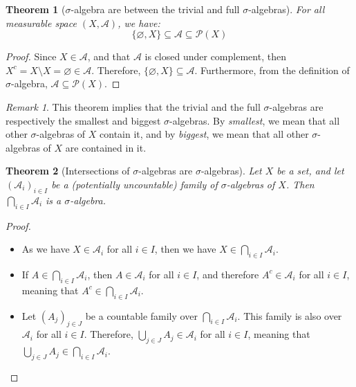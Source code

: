 \documentclass{article}
\newtheorem{theorem}{Theorem}[section]
\theoremstyle{definition}
\theoremstyle{remark}
\newtheorem*{remark}{Remark}
\theoremstyle{example}
\begin{document}
\begin{theorem}[$\sigma$-algebra are between the trivial and full $\sigma$-algebras]
    For all measurable space $(X, \mathcal{A})$, we have:
        $$\{\varnothing, X\} \subseteq \mathcal{A} \subseteq \mathcal{P}(X)$$
\end{theorem}

\begin{proof}
    Since $X \in \mathcal{A}$, and that $\mathcal{A}$ is closed under complement, then $X^c = X \setminus X = \varnothing \in \mathcal{A}$. Therefore, $\{\varnothing, X\} \subseteq \mathcal{A}$. Furthermore, from the definition of $\sigma$-algebra, $\mathcal{A} \subseteq \mathcal{P}(X)$. 
\end{proof}

\begin{remark}
    This theorem implies that the trivial and the full $\sigma$-algebras are respectively the smallest and biggest $\sigma$-algebras. By \textit{smallest}, we mean that all other $\sigma$-algebras of $X$ contain it, and by \textit{biggest}, we mean that all other $\sigma$-algebras of $X$ are contained in it.
\end{remark}

\begin{theorem}[Intersections of $\sigma$-algebras are $\sigma$-algebras]
    Let $X$ be a set, and let $(\mathcal{A}_i)_{i \in I}$ be a (potentially uncountable) family of $\sigma$-algebras of $X$. Then $\bigcap_{i \in I} \mathcal{A}_i$ is a $\sigma$-algebra.
\end{theorem}

\begin{proof}~
    \begin{itemize}
        \item As we have $X \in \mathcal{A}_i$ for all $i \in I$, then we have $X \in \bigcap_{i \in I} \mathcal{A}_i$.
        \item If $A \in \bigcap_{i \in I} \mathcal{A}_i$, then $A \in \mathcal{A}_i$ for all $i \in I$, and therefore $A^c \in \mathcal{A}_i$ for all $i \in I$, meaning that $A^c \in \bigcap_{i \in I} \mathcal{A}_i$.
        \item Let $(A_j)_{j \in J}$ be a countable family over $\bigcap_{i \in I} \mathcal{A}_i$. This family is also over $\mathcal{A}_i$ for all $i \in I$. Therefore, $\bigcup_{j \in J} A_j \in \mathcal{A}_i$ for all $i \in I$, meaning that $\bigcup_{j \in J} A_j \in \bigcap_{i \in I} \mathcal{A}_i$.
    \end{itemize}
\end{proof}
\end{document}
